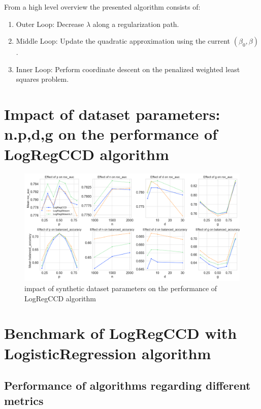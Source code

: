 \documentclass[12pt]{article}
\begin{document}
From a high level overview the presented algorithm consists of:

\begin{enumerate}
    \item Outer Loop: Decrease $\lambda$ along a regularization path.
    \item Middle Loop: Update the quadratic approximation using the current $(\beta_0, \beta)$.
    \item Inner Loop: Perform coordinate descent on the penalized weighted least squares problem.
\end{enumerate}



\section{Impact of dataset parameters: n.p,d,g on the performance of LogRegCCD algorithm}


\begin{figure}[h]
    \centering
  \includegraphics[width=\textwidth]{../results/parameter_facet_grid.png}
    \caption{impact of synthetic dataset parameters on the performance of LogRegCCD algorithm}
    \label{fig:synthetic-dataset-parameters}
  \end{figure}

\section{Benchmark of LogRegCCD with LogisticRegression algorithm}

\subsection{Performance of algorithms regarding different metrics}
\end{document}

